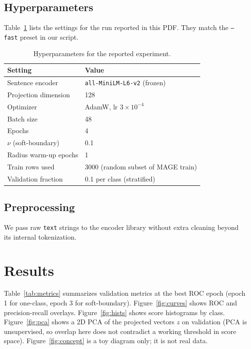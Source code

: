 \documentclass[11pt]{article}
\begin{document}
\subsection{Hyperparameters}
Table~\ref{tab:hparams} lists the settings for the run reported in this PDF.
They match the \texttt{--fast} preset in our script.

\begin{table}[t]
\centering
\small
\begin{tabular}{ll}
\toprule
Setting & Value \\
\midrule
Sentence encoder & \texttt{all-MiniLM-L6-v2} (frozen) \\
Projection dimension & 128 \\
Optimizer & AdamW, lr $3{\times}10^{-4}$ \\
Batch size & 48 \\
Epochs & 4 \\
$\nu$ (soft-boundary) & 0.1 \\
Radius warm-up epochs & 1 \\
Train rows used & 3000 (random subset of MAGE train) \\
Validation fraction & 0.1 per class (stratified) \\
\bottomrule
\end{tabular}
\caption{Hyperparameters for the reported experiment.}
\label{tab:hparams}
\end{table}

\subsection{Preprocessing}
We pass raw \texttt{text} strings to the encoder library without extra cleaning beyond its internal tokenization.

\section{Results}
Table~\ref{tab:metrics} summarizes validation metrics at the best ROC epoch (epoch 1 for one-class, epoch 3 for soft-boundary).
Figure~\ref{fig:curves} shows ROC and precision-recall overlays.
Figure~\ref{fig:hists} shows score histograms by class.
Figure~\ref{fig:pca} shows a 2D PCA of the projected vectors $z$ on validation (PCA is unsupervised, so overlap here does not contradict a working threshold in score space).
Figure~\ref{fig:concept} is a toy diagram only; it is not real data.
\end{document}
